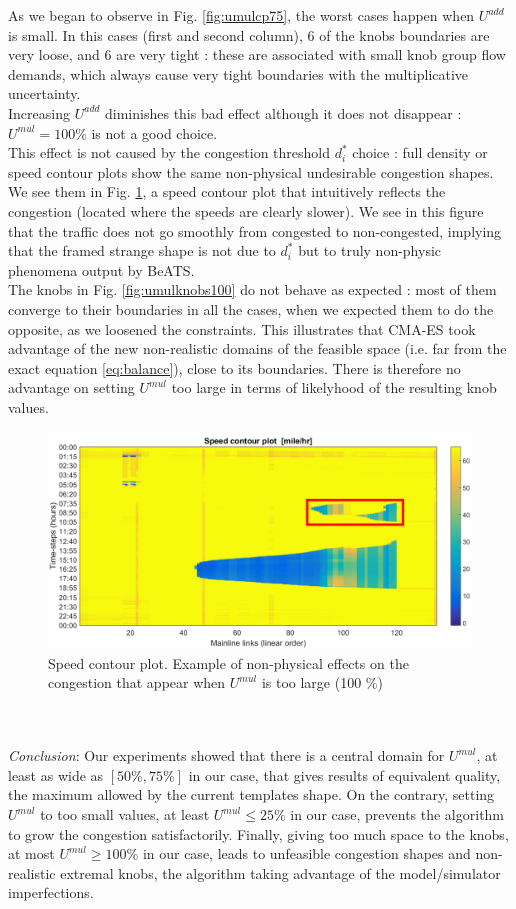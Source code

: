 As we began to observe in Fig. \ref{fig:umulcp75}, the worst cases happen when $U^{add}$ is small. In this cases (first and second column), $6$ of the knobs boundaries are very loose, and $6$ are very tight : these are associated with small knob group flow demands, which always cause very tight boundaries with the multiplicative uncertainty.\\
Increasing $U^{add}$ diminishes this bad effect although it does not disappear : $U^{mul}=100\% $ is not a good choice.\\
This effect is not caused by the congestion threshold $d_{i}^{*}$ choice : full density or speed contour plots show the same non-physical undesirable congestion shapes. We see them in Fig. \ref{fig:badcontourplot}, a speed contour plot that intuitively reflects the congestion (located where the speeds are clearly slower).
We see in this figure that the traffic does not go smoothly from congested to non-congested, implying that the framed strange shape is not due to $d_{i}^{*}$ but to truly non-physic phenomena output by BeATS.\\

The knobs in Fig. \ref{fig:umulknobs100} do not behave as expected : most of them converge to their boundaries in all the cases, when we expected them to do the opposite, as we loosened the constraints. This illustrates that CMA-ES took advantage of the new non-realistic domains of the feasible space (i.e. far from the exact equation \ref{eq:balance}), close to its boundaries. There is therefore no advantage on setting $U^{mul}$ too large in terms of likelyhood of the resulting knob values.
\begin{figure}[!h]
	\label{fig:badcontourplot}
	\caption{Speed contour plot. Example of non-physical effects on the congestion that appear when $U^{mul}$ is too large (100 \%)}
	\includegraphics[width=7in]{figures/results_figures/Umul/badcontourplot.png}
\end{figure}
\\
\\
\emph{Conclusion}: Our experiments showed that there is a central domain for $U^{mul}$, at least as wide as $[50\% , 75\% ]$ in our case, that gives results of equivalent quality, the maximum allowed by the current templates shape. On the contrary, setting $U^{mul}$ to too small values, at least $U^{mul}\leq 25\% $ in our case, prevents the algorithm to grow the congestion satisfactorily. Finally, giving too much space to the knobs, at most $U^{mul}\geq 100\%$ in our case, leads to unfeasible congestion shapes and non-realistic extremal knobs, the algorithm taking advantage of the model/simulator imperfections. 